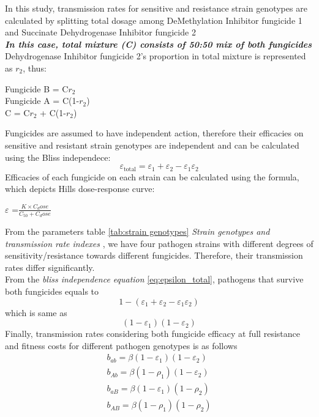 \documentclass{report}
\begin{document}
In this study, transmission rates for sensitive and resistance strain genotypes are calculated by splitting total dosage among
DeMethylation Inhibitor fungicide 1 and Succinate Dehydrogenase Inhibitor fungicide 2\\
\textit{\textbf{In this case, total mixture (C) consists of 50:50 mix of both fungicides}}\\
Dehydrogenase Inhibitor fungicide 2's proportion in total mixture is represented as $r_2$, thus:\\
\begin{center}
    Fungicide B = C$r_2$\\
    Fungicide A = C(1-$r_2$)\\
    C = C$r_2$ + C(1-$r_2$)\\
\end{center}
Fungicides are assumed to have independent action, therefore their efficacies on sensitive and resistant strain genotypes
are independent and can be calculated using the Bliss independece:
\begin{equation}
  \varepsilon_{\text{total}} = \varepsilon_1 + \varepsilon_2 - \varepsilon_1 \varepsilon_2
  \label{eq:epsilon_total}
\end{equation}
Efficacies of each fungicide on each strain can be calculated using the formula, which depicts Hills dose-response curve:
\begin{center}
    $\varepsilon$ =$\frac{K \times C_dose}{C_{50}+C_dose}$
\end{center}
From the parameters table \ref{tab:strain genotypes} \textit{Strain genotypes and transmission rate indexes} , we have four pathogen strains with different degrees of sensitivity/resistance towards different fungicides. Therefore, their transmission rates differ significantly.\\
From the \textit{bliss independence equation} \ref{eq:epsilon_total}, pathogens that survive both fungicides equals to \[1-(\varepsilon_1 + \varepsilon_2 - \varepsilon_1 \varepsilon_2)\] which is same as \[(1-\varepsilon_1)(1-\varepsilon_2)\]
Finally, transmission rates considering both fungicide efficacy at full resistance and fitness costs for different pathogen genotypes is as follows\\
\begin{align}
    b_{ab}=\beta(1-\varepsilon_1)(1-\varepsilon_2)\\
    b_{Ab}=\beta(1-\rho_1)(1-\varepsilon_2)\\
    b_{aB}=\beta(1-\varepsilon_1)(1-\rho_2)\\
    b_{AB}=\beta(1-\rho_1)(1-\rho_2)
\end{align}
\end{document}
